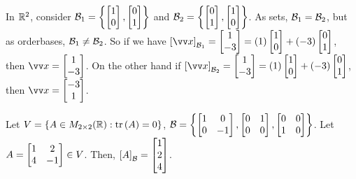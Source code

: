 \begin{example}
    In ${\mathbb{R}}^2$, consider $\mathcal{B}_1 = \left\{ \begin{bmatrix} 1 \\ 0 \end{bmatrix}, \begin{bmatrix} 0 \\ 1 \end{bmatrix} \right\}$ and $\mathcal{B}_2 = \left\{ \begin{bmatrix} 0 \\ 1 \end{bmatrix}, \begin{bmatrix} 1 \\ 0 \end{bmatrix} \right\}$.
    As sets, $\mathcal{B}_1 = \mathcal{B}_2$, but as orderbases, $\mathcal{B}_1 \neq \mathcal{B}_2$. So if we have $\left[ \vx \right]_{\mB_1} = \cv{1 \\ -3} = (1)\cv{1 \\ 0} + (-3)\cv{0 \\ 1}$,
    then $\vx = \cv{1 \\ -3}$.
    On the other hand if $\left[ \vx \right]_{\mB_2} = \cv{1 \\ -3} = (1)\cv{1 \\ 0} + (-3)\cv{0 \\ 1}$, then $\vx = \cv{-3 \\ 1}$.
\end{example}

\begin{example}
    Let $V = \left\{ A \in M_{2 \times 2}({\mathbb{R}}): \operatorname{tr}{(A)} = 0 \right\}$, $\mathcal{B} = \left\{ \begin{bmatrix} 1 & 0 \\ 0 & -1 \end{bmatrix}, \begin{bmatrix} 0 & 1 \\ 0 & 0 \end{bmatrix}, \begin{bmatrix} 0 & 0 \\ 1 & 0 \end{bmatrix} \right\}$.
    Let $A = \begin{bmatrix} 1 & 2 \\ 4 & -1 \end{bmatrix} \in V$. Then, $\left[ A \right]_{\mathcal{B}} = \begin{bmatrix} 1 \\ 2 \\ 4 \end{bmatrix}$.
\end{example}

